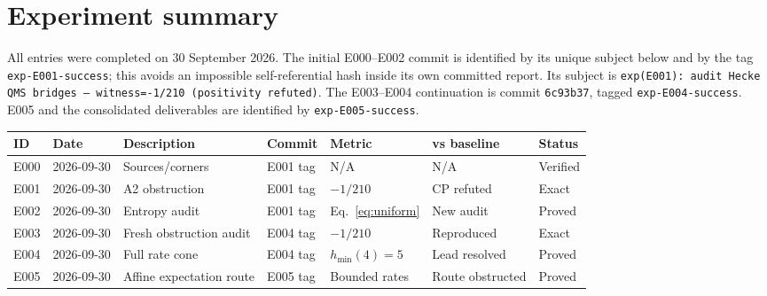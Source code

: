 \documentclass[11pt]{article}
\theoremstyle{remark}\newtheorem{remark}[definition]{Remark}
\begin{document}
\section{Experiment summary}
All entries were completed on 30 September 2026. The initial E000--E002 commit
is identified by its unique subject below and by the tag
\texttt{exp-E001-success}; this avoids an impossible self-referential hash
inside its own committed report. Its subject is
\texttt{exp(E001): audit Hecke QMS bridges -- witness=-1/210 (positivity refuted)}.
The E003--E004 continuation is commit \texttt{6c93b37}, tagged
\texttt{exp-E004-success}. E005 and the consolidated deliverables are
identified by \texttt{exp-E005-success}.
{\small\setlength{\tabcolsep}{8pt}\renewcommand{\arraystretch}{1.2}
\begin{tabular}{p{.05\linewidth}p{.12\linewidth}p{.16\linewidth}p{.10\linewidth}p{.10\linewidth}p{.15\linewidth}p{.08\linewidth}}\toprule
ID & Date & Description & Commit & Metric & vs baseline & Status\\\midrule
E000 & 2026-09-30 & Sources/corners & E001 tag & N/A & N/A & Verified\\
E001 & 2026-09-30 & A2 obstruction & E001 tag & $-1/210$ & CP refuted & Exact\\
E002 & 2026-09-30 & Entropy audit & E001 tag & Eq.~\eqref{eq:uniform} & New audit & Proved\\
E003 & 2026-09-30 & Fresh obstruction audit & E004 tag & $-1/210$ & Reproduced & Exact\\
E004 & 2026-09-30 & Full rate cone & E004 tag & $h_{\min}(4)=5$ & Lead resolved & Proved\\
E005 & 2026-09-30 & Affine expectation route & E005 tag & Bounded rates & Route obstructed & Proved\\\bottomrule
\end{tabular}}
\end{document}
